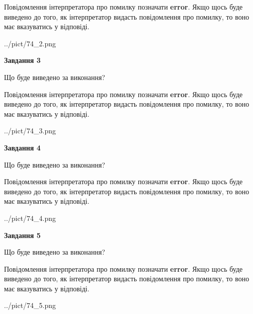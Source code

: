 \documentclass[12pt, ukrainian]{article}
\begin{document}
{\begin {large}
Повідомлення інтерпретатора про помилку позначати \textbf{error}.
Якщо щось буде виведено до того, як інтерпретатор видасть повідомлення про помилку, 
то воно має вказуватись у відповіді. \par


\begin{center}
	{../pict/74_2.png}
\end{center}
\newpage

{\begin {center}\textbf{Завдання 3}\end {center}}\par
Що буде виведено за виконання?

Повідомлення інтерпретатора про помилку позначати \textbf{error}.
Якщо щось буде виведено до того, як інтерпретатор видасть повідомлення про помилку, 
то воно має вказуватись у відповіді. \par


\begin{center}
	{../pict/74_3.png}
\end{center}
\newpage

{\begin {center}\textbf{Завдання 4}\end {center}}\par
Що буде виведено за виконання?

Повідомлення інтерпретатора про помилку позначати \textbf{error}.
Якщо щось буде виведено до того, як інтерпретатор видасть повідомлення про помилку, 
то воно має вказуватись у відповіді. \par


\begin{center}
	{../pict/74_4.png}
\end{center}
\newpage

{\begin {center}\textbf{Завдання 5}\end {center}}\par
Що буде виведено за виконання?

Повідомлення інтерпретатора про помилку позначати \textbf{error}.
Якщо щось буде виведено до того, як інтерпретатор видасть повідомлення про помилку, 
то воно має вказуватись у відповіді. \par


\begin{center}
	{../pict/74_5.png}
\end{center}
\newpage


\end{large}}
\end{document}
